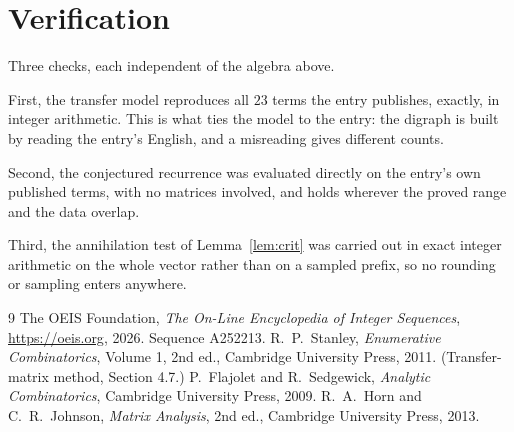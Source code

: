 \documentclass[11pt,a4paper]{article}
\theoremstyle{plain}
\theoremstyle{definition}
\begin{document}
\section{Verification}

Three checks, each independent of the algebra above.

First, the transfer model reproduces all $23$ terms the entry publishes, exactly, in
integer arithmetic. This is what ties the model to the entry: the digraph is built by reading
the entry's English, and a misreading gives different counts.

Second, the conjectured recurrence was evaluated directly on the entry's own published terms,
with no matrices involved, and holds wherever the proved range and the data overlap.

Third, the annihilation test of Lemma~\ref{lem:crit} was carried out in exact integer
arithmetic on the whole vector rather than on a sampled prefix, so no rounding or sampling
enters anywhere.

\begin{thebibliography}{9}
 The OEIS Foundation, \emph{The On-Line Encyclopedia of Integer
Sequences}, \url{https://oeis.org}, 2026. Sequence A252213.
 R.~P.~Stanley, \emph{Enumerative Combinatorics}, Volume 1, 2nd ed.,
Cambridge University Press, 2011. (Transfer-matrix method, Section 4.7.)
 P.~Flajolet and R.~Sedgewick, \emph{Analytic Combinatorics}, Cambridge
University Press, 2009.
 R.~A.~Horn and C.~R.~Johnson, \emph{Matrix Analysis}, 2nd ed., Cambridge
University Press, 2013.
\end{thebibliography}
\end{document}
